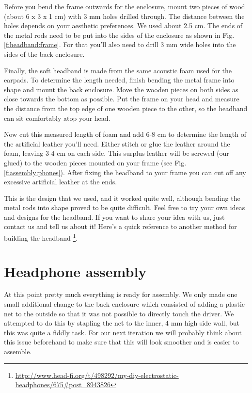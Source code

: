 \documentclass{article}
\begin{document}
Before you bend the frame outwards for the enclosure, mount two pieces of wood (about 6 x 3 x 1 cm) with 3 mm holes drilled through. The distance between the holes depends on your aesthetic preferences. We used about 2.5 cm. 
The ends of the metal rods need to be put into the sides of the enclosure as shown in Fig. \ref{f:headband:frame}. For that you'll also need to drill 3 mm wide holes into the sides of the back enclosure.

Finally, the soft headband is made from the same acoustic foam used for the earpads. To determine the length needed, finish bending the metal frame into shape and mount the back enclosure. Move the wooden pieces on both sides as close towards the bottom as possible. Put the frame on your head and measure the distance from the top edge of one wooden piece to the other, so the headband can sit comfortably atop your head.


Now cut this measured length of foam and add 6-8 cm to determine the length of the artificial leather you'll need. Either stitch or glue the leather around the foam, leaving 3-4 cm on each side. This  surplus leather will be screwed (our glued) to the wooden pieces mounted on your frame (see Fig. \ref{f:assembly:phones}). After fixing the headband to your frame you can cut off any excessive artificial leather at the ends.


This is the design that we used, and it worked quite well, although bending the metal rods into shape proved to be quite difficult. Feel free to try your own ideas and designs for the headband. If you want to share your idea with us, just contact us and tell us about it! Here's a quick reference to another method for building the headband
\footnote{\url{http://www.head-fi.org/t/498292/my-diy-electrostatic-headphones/675#post_8943826}}.


\section{Headphone assembly}
\label{s:assembly}

At this point pretty much everything is ready for assembly. We only made one small additional change to the back enclosure which consisted of adding a plastic net to the outside so that it was not possible to directly touch the driver. We attempted to do this by stapling the net to the inner, 4 mm high side wall, but this was quite a fiddly task. For our next iteration we will probably think about this issue beforehand to make sure that this will look smoother and is easier to assemble.
\end{document}
